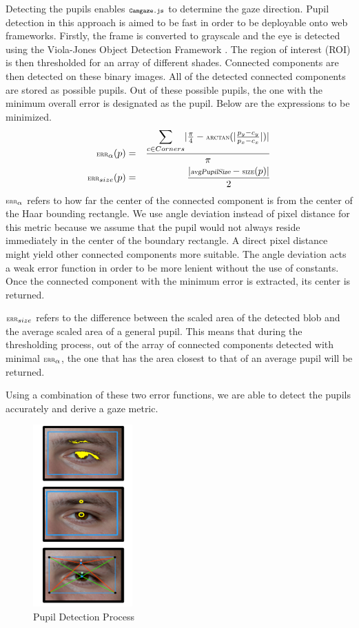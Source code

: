 \documentclass[annual]{acmsiggraph}
\newcommand{\Acronym}[1]{\ensuremath{{\small{\texttt{#1}}}}}
\newcommand{\Name}{\Acronym{Camgaze.js}} \newcommand{\False}{\Constant{false}}
\newcommand{\Function}[1]{\ensuremath{{\small \textsc{#1}}}}
\newcommand{\Constant}[1]{\ensuremath{\small{\texttt{#1}}}}
\newcommand{\Var}[1]{\ensuremath{{\small{\textsl{#1}}}}}
\begin{document}
Detecting the pupils enables $\Name$ to determine the gaze direction.
Pupil detection in this approach is aimed to be fast in order to be deployable
onto web frameworks. Firstly, the frame is converted to grayscale and the eye
is detected using the Viola-Jones Object Detection Framework \cite{Viola01}.
The region of interest (ROI) is then thresholded for an array of different
shades. Connected components are then detected on these binary images. All of
the detected connected components are stored as possible pupils.  Out of these
possible pupils, the one with the minimum overall error is designated as the
pupil.  Below are the expressions to be minimized. \begin{eqnarray}
\Function{err}_{\alpha}(p) &=& \frac{ \mathlarger{\sum}_{c \in Corners}{ \vert
\frac{\pi}{4} - \Function{arctan}( \vert \frac{p_y - c_y}{p_x - c_x} \vert)
\vert } }{\pi} \\ \Function{err}_{size}(p) &=& \frac{ \vert \Var{avgPupilSize}
- \Function{size}(p) \vert }{2} \end{eqnarray} $\Function{err}_{\alpha}$ refers
to how far the center of the connected component is from the center of the Haar
bounding rectangle. We use angle deviation instead of pixel distance for this
metric because we assume that the pupil would not always reside immediately in
the center of the boundary rectangle. A direct pixel distance might yield other
connected components more suitable.  The angle deviation acts a weak error
function in order to be more lenient without the use of constants.  Once the
connected component with the minimum error is extracted, its center is
returned.

$\Function{err}_{size}$ refers to the difference between the scaled area of the
detected blob and the average scaled area of a general pupil. This means that
during the thresholding process, out of the  array of connected components
detected with minimal $\Function{err}_{\alpha}$, the one that has the area
closest to that of an average pupil will be returned.

Using a combination of these two error functions, we are able to detect the
pupils accurately and derive a gaze metric.

\begin{figure}[ht]

    \centering

    \includegraphics[width=1.5in]{figs/pupilDetection.pdf}

    \caption{Pupil Detection Process}

\end{figure}
\end{document}
